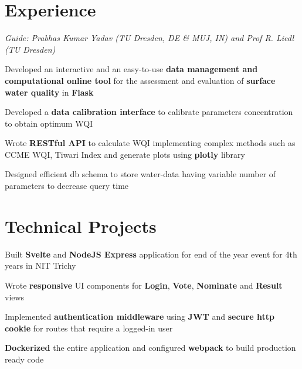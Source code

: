 \documentclass[]{deedy-resume-openfont}
\begin{document}
\hfill
\begin{minipage}[t]{0.69\textwidth}

\section{Experience}
\textit{Guide: Prabhas Kumar Yadav (TU Dresden, DE \& MUJ, IN) and Prof R. Liedl (TU Dresden)}
\vspace{\topsep}
\begin{tightemize}
\item Developed an interactive and an easy-to-use \textbf{data management and computational online tool} for the assessment and evaluation of \textbf{surface water quality} in \textbf{Flask} \item Developed a \textbf{data calibration interface} to calibrate parameters concentration to obtain optimum WQI \item Wrote \textbf{RESTful API} to calculate WQI implementing complex methods such as CCME WQI, Tiwari Index and generate plots using \textbf{plotly} library \item Designed efficient db schema to store water-data having variable number of parameters to decrease query time
\end{tightemize}
\sectionsep

\section{Technical Projects}

\begin{tightemize}
\item Built \textbf{Svelte} and \textbf{NodeJS Express} application for end of the year event for 4th years in NIT Trichy \item Wrote \textbf{responsive} UI components for \textbf{Login}, \textbf{Vote}, \textbf{Nominate} and \textbf{Result} views \item Implemented \textbf{authentication middleware} using \textbf{JWT} and \textbf{secure http cookie} for routes that require a logged-in user \item \textbf{Dockerized} the entire application and configured \textbf{webpack} to build production ready code
\end{tightemize}
\sectionsep


\end{minipage}
\end{document}
